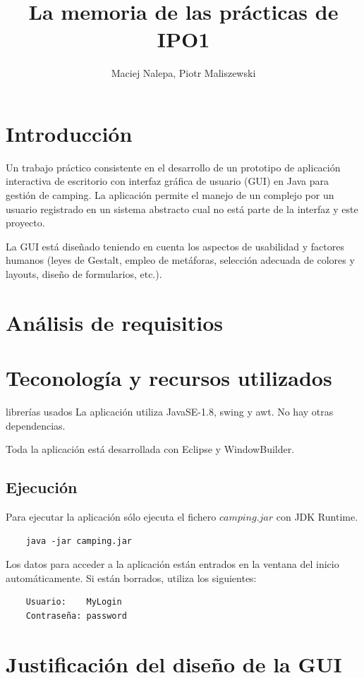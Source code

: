 \documentclass[a4paper]{article}
\title{La memoria de las prácticas de IPO1}
\author{Maciej Nalepa, Piotr Maliszewski}
\begin{document}
\maketitle

\section{Introducción}
Un trabajo práctico consistente en el desarrollo de un prototipo de aplicación interactiva de escritorio con interfaz gráfica de usuario (GUI) en Java para gestión de camping. La aplicación permite el manejo de un complejo por un usuario registrado en un sistema abstracto cual no está parte de la interfaz y este proyecto.

La GUI está diseñado teniendo en cuenta los aspectos de usabilidad y factores humanos (leyes de Gestalt, empleo de metáforas, selección adecuada de colores y layouts, diseño de formularios, etc.).

\section{Análisis de requisitios}

\section{Teconología y recursos utilizados}
 librerías usados
La aplicación utiliza JavaSE-1.8, swing y awt. No hay otras dependencias.

Toda la aplicación está desarrollada con Eclipse y WindowBuilder.

\subsection{Ejecución}
Para ejecutar la aplicación sólo ejecuta el fichero $camping.jar$ con JDK Runtime.
\begin{lstlisting}
	java -jar camping.jar
\end{lstlisting}

Los datos para acceder a la aplicación están entrados en la ventana del inicio automáticamente. Si están borrados, utiliza los siguientes:
\begin{lstlisting}
	Usuario:	MyLogin
	Contraseña:	password
\end{lstlisting}

\section{Justificación del diseño de la GUI}
\end{document}
